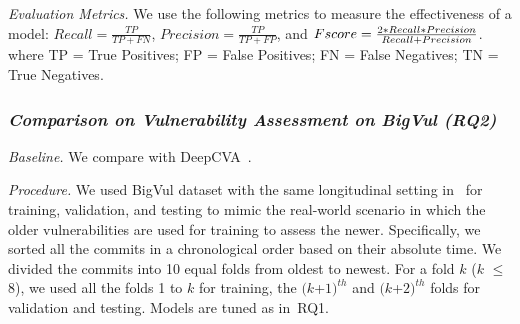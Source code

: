 \emph{Evaluation Metrics.} We use the following metrics to measure the
effectiveness of a model: $Recall = \frac{TP}{TP+FN}$, $Precision =
\frac{TP}{TP+FP}$, and $F\-score =
\frac{2*Recall*Precision}{Recall+Precision}$.
where TP = True Positives; FP = False Positives; FN = False Negatives; TN = True Negatives.


\subsubsection{\bf \em Comparison on Vulnerability Assessment on BigVul (RQ2)}

{\em Baseline.} We compare {\tool} with DeepCVA~\cite{deepCVA-ase21}.


{\em Procedure.} We used BigVul dataset with the same
longitudinal setting in~\cite{deepCVA-ase21,falessi2020need} for
training, validation, and testing to mimic the real-world scenario in
which the older vulnerabilities are used for training to assess the
newer. Specifically, we sorted all the commits in a chronological
order based on their absolute time. We divided the commits into 10
equal folds from oldest to newest. For a fold $k$ ($k$ $\le$ $8$), we
used all the folds 1 to $k$ for training, the $(k$+$1)^{th}$ and
$(k$+$2)^{th}$ folds for validation and testing. Models are tuned as
in~RQ1.



